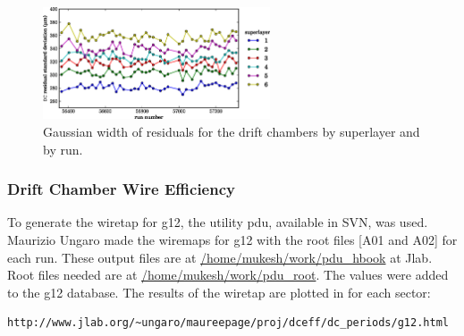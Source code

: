 \begin{figure}\begin{center}
\includegraphics[width=0.6\textwidth]{figures/calib/dc/dc_resid_sigma.eps}
\caption[DC Residuals (Width)]{\label{fig:calib.dc.residuals.wid}Gaussian width of residuals for the drift chambers by superlayer and by run.}
\end{center}\end{figure}

\subsubsection{\label{sec:calib.dc.eff}Drift Chamber Wire Efficiency}
To generate the wiretap for g12, the utility pdu, available in SVN, was used. Maurizio Ungaro made the wiremaps for g12 with the root files [A01 and A02] for each run. These output files are at \url{/home/mukesh/work/pdu_hbook} at Jlab. Root files needed are at \url{/home/mukesh/work/pdu_root}. The values were added to the g12 database. The results of the wiretap are plotted in for each sector:

\begin{verbatim}
http://www.jlab.org/~ungaro/maureepage/proj/dceff/dc_periods/g12.html
\end{verbatim}

\FloatBarrier
